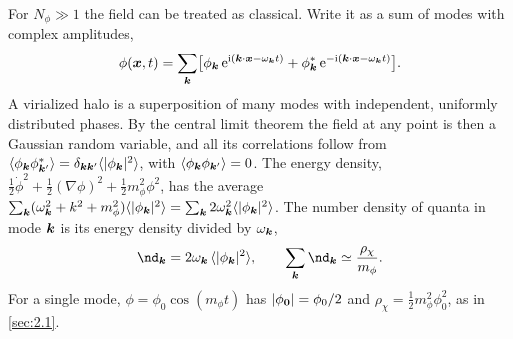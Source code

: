 For $N_\phi \gg 1$ the field can be treated as classical. Write it as a sum of modes with complex amplitudes,
\begin{equation*}
  \phi(\bm{x},t) = \sum_{\bm{k}}\bigl[\phi_{\bm{k}}\,\mathrm{e}^{\mathrm{i}(\bm{k}\cdot\bm{x} - \omega_{\bm{k}}t)} + \phi_{\bm{k}}^*\,\mathrm{e}^{-\mathrm{i}(\bm{k}\cdot\bm{x} - \omega_{\bm{k}}t)}\bigr] .
\end{equation*}
A virialized halo is a superposition of many modes with independent, uniformly distributed phases. By the central limit theorem the field at any point is then a Gaussian random variable, and all its correlations follow from $\langle\phi_{\bm{k}}\phi_{\bm{k}'}^*\rangle = \delta_{\bm{k}\bm{k}'}\langle|\phi_{\bm{k}}|^2\rangle$, with $\langle\phi_{\bm{k}}\phi_{\bm{k}'}\rangle = 0$. The energy density, $\frac12\dot\phi^2 + \frac12(\nabla\phi)^2 + \frac12m_\phi^2\phi^2$, has the average $\sum_{\bm{k}}(\omega_{\bm{k}}^2 + k^2 + m_\phi^2)\langle|\phi_{\bm{k}}|^2\rangle = \sum_{\bm{k}}2\omega_{\bm{k}}^2\langle|\phi_{\bm{k}}|^2\rangle$. The number density of quanta in mode $\bm{k}$ is its energy density divided by $\omega_{\bm{k}}$,
\begin{equation*}
  \nd_{\vect{k}} = 2\omega_{\vect{k}}\,\langle|\phi_{\vect{k}}|^2\rangle , \qquad \sum_{\vect{k}}\nd_{\vect{k}} \simeq \frac{\rho_\chi}{m_\phi} .
\end{equation*}
For a single mode, $\phi = \phi_0\cos(m_\phi t)$ has $|\phi_{\bm{0}}| = \phi_0/2$ and $\rho_\chi = \frac12m_\phi^2\phi_0^2$, as in \cref{sec:2.1}.

